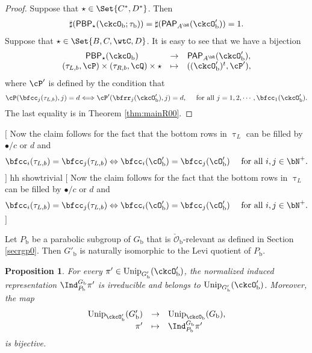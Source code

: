 \documentclass[12pt,a4paper]{amsart}
\newcommand{\trivial}[2][]{\if\relax\detokenize{#1}\relax
  {%
      \color{orange} \vspace{0em} $[$  #2 $]$
      \color{black}
  }
  \else
\ifx#1h
\ifcsname showtrivial\endcsname
{%
    \color{orange} \vspace{0em}  $[$ #2 $]$
    \color{black}
}
\fi
\else {\red Wrong argument!} \fi
\fi
}
\newcommand{\CO}{{\mathcal {O}}}
\newcommand{\be}{\begin {equation}}
\newcommand{\ee}{\end {equation}}
\numberwithin{equation}{section}
\newtheorem{prop}[thm]{Proposition}
\theoremstyle{remark}
\def\Unip{\mathrm{Unip}}
\def\PP{\mathsf{PAP}}
\def\PBP{\mathsf{PBP}}
\def\ckcOb{\ckcO_{\mathrm b}}
\def\ckcOpb{\ckcO'_{\mathrm b}}
\def\cOpb{\cO'_{\mathrm b}}
\def\Gb{G_{\mathrm b}}
\def\Gpb{G'_{\mathrm b}}
\def\Pb{P_{\mathrm b}}
\begin{document}
\begin{proof} Suppose that $\star \in \Set{C^{*},D^{*}}$. Then
\[
    \begin{split}
      \sharp(\PBP_{\star}(\ckcO_{\mathrm b};\tau_{\mathrm b}))= \sharp(\PP_{A^{\bH}}(\ckcO'_{\mathrm b}))= 1.
    \end{split}
\]
  Suppose that $\star \in \Set{B,C,\wtC,D}$.
   It is easy to see that we have a bijection
  \[
    \begin{array}{ccc}
      \PBP_{\star}(\ckcO_{\mathrm b}) &  \rightarrow & \PP_{A^{\bR}}(\ckcO'_{\mathrm b}),\\
      (\tau_{L,b},\cP)\times (\tau_{R,b},\cQ)\times \star & \mapsto & ((\ckcO'_{\mathrm b})^t,\cP'),
    \end{array}
  \]
  where $\cP'$ is defined by the condition that
  \[
    \cP(\bfcc_{j}(\tau_{L,b}),j)=d \Longleftrightarrow \cP'(\bfrr_{j}(\ckcO'_{\mathrm b}),j)=d, \quad \textrm{ for all } j=1,2,\cdots, \bfcc_{1}(\ckcO'_{\mathrm b}).
  \]
  The last equality is in Theorem \ref{thm:mainR00}.   \end{proof}


  \trivial[h]{
    Now the claim follows for the fact that the bottom rows in $\uptau_{L}$ can
    be filled by $\bullet/c$ or $d$ and
    \[
      \bfcc_{i}(\tau_{L,b}) = \bfcc_{j}(\tau_{L,b}) \Leftrightarrow \bfcc_{i}(\cOpb) = \bfcc_{j}(\cOpb) \quad \textrm{ for all } i,j\in \bN^{+}.
    \]
  }



Let $P_{\mathrm b}$ be a parabolic subgroup of $G_{\mathrm b}$ that is  $\check \CO_\mathrm b$-relevant as defined in Section \ref{secrgp0}. Then
  $G'_{\mathrm b}$ is naturally isomorphic to the Levi quotient of $P_\mathrm b$.


\def\fIb{\fI_{\mathrm b}}
\def\pib{\pi_{\mathrm b}}


\begin{prop}\label{lem:Unip.BP}
For every $\pi'\in \Unip_{\Gpb}(\ckcOpb)$, the normalized induced representation
$\Ind_{\Pb}^{\Gb}\pi'$ is irreducible and belongs to $\Unip_{\Gpb}(\ckcOpb)$.
Moreover, the map
  \be\label{badind}
    \begin{array}{rcl}
      \Unip_{\ckcO'_{\mathrm b}}(G'_{\mathrm b}) & \rightarrow & \Unip_{\ckcOb}(\Gb), \\
      \pi' & \mapsto & %
                        \Ind_{\Pb}^{\Gb}\pi'
    \end{array}
  \ee
  is bijective.
\end{prop}
\end{document}
